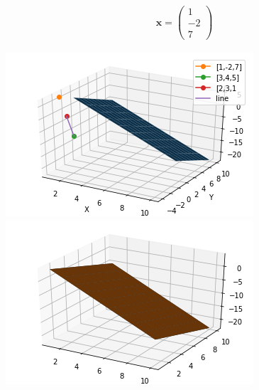 \documentclass[10pt,a4paper,twocolumn]{article}
\newcommand{\myvec}[1]{\ensuremath{\begin{pmatrix}#1\end{pmatrix}}}
\numberwithin{equation}{section}
\begin{document}

\begin{align}
\textbf{x}=\myvec{1\\-2\\7 }
\end{align}
\pagebreak

\includegraphics{Figure_3}
\includegraphics{Figure_4}






\end{document}
